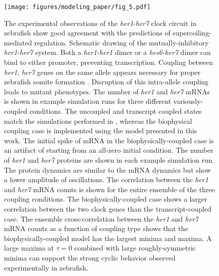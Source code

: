 \documentclass[11pt]{article}
\begin{document}
\begin{figure}[htbp]
    \centering
    {\texttt{[image: figures/modeling\_paper/fig\_5.pdf]}
    \label{fig:her1_her7_cartoon}
    \label{fig:zinani_summary_cartoon}
    \label{fig:zinani_mRNA_behavior}
    \label{fig:zinani_protein_behavior}
    \label{fig:zinani_correlation_coeff}
    \label{fig:zinani_cross_correlation}
    }
\end{figure}
\begin{figure}[htbp]
    \ContinuedFloat
    \caption{The experimental observations of the \textit{her1}-\textit{her7} clock circuit in zebrafish\parencite{zinaniPairingSegmentationClock2021} show good agreement with the predictions of supercoiling-mediated regulation.
         Schematic drawing of the mutually-inhibitory \textit{her1}-\textit{her7} system. Both a \textit{her1-her1} dimer or a \textit{hes6-her7} dimer can bind to either promoter, preventing transcription.
         Coupling between \textit{her1}, \textit{her7} genes on the same allele appears necessary for proper zebrafish somite formation \parencite{zinaniPairingSegmentationClock2021}. Disruption of this intra-allele coupling leads to mutant phenotypes.
         The number of \textit{her1} and \textit{her7} mRNAs is shown in example simulation runs for three different variously-coupled conditions. The uncoupled and transcript coupled states match the simulations performed in \textcite{zinaniPairingSegmentationClock2021}, whereas the biophysical coupling case is implemented using the model presented in this work. The initial spike of mRNA in the biophysically-coupled case is an artifact of starting from an all-zero initial condition.
         The number of \textit{her1} and \textit{her7} proteins are shown in each example simulation run. The protein dynamics are similar to the mRNA dynamics but show a lower amplitude of oscillations.
         The correlation between the \textit{her1} and \textit{her7} mRNA counts is shown for the entire ensemble of the three coupling conditions. The biophysically-coupled case shows a larger correlation between the two clock genes than the transcript-coupled case.
         The ensemble cross-correlation between the \textit{her1} and \textit{her7} mRNA counts as a function of coupling type shows that the biophysically-coupled model has the largest minima and maxima. A large maxima at \(\tau = 0\) combined with large roughly-symmetric minima can support the strong cyclic behavior observed experimentally in zebrafish.
    } \label{fig:top:her1_her7}
\end{figure}
\end{document}

